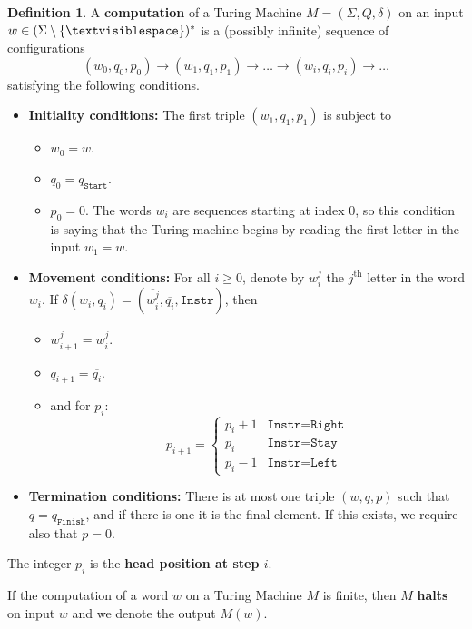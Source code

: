\documentclass[12pt]{article}
\theoremstyle{plain}
\theoremstyle{definition}
\newtheorem{defn}[thm]{Definition} %
\newcommand{\lto}{\longrightarrow}
\newcommand{\blank}{\textvisiblespace}
\begin{document}
	\begin{defn}\label{def:computation}
		A \textbf{computation} of a Turing Machine $M = (\Sigma, Q, \delta)$ on an input $w \in (\Sigma\setminus \{ \blank\})^\ast$ is a (possibly infinite) sequence of configurations
		\begin{equation}
			(w_0, q_0, p_0) \lto (w_1, q_1, p_1) \lto \ldots \lto (w_i, q_i, p_i) \lto \ldots
			\end{equation}
		satisfying the following conditions.
		\begin{itemize}
			\item \textbf{Initiality conditions:} The first triple $(w_1, q_1, p_1)$ is subject to
			\begin{itemize}
				\item $w_0 = w$.
				\item $q_0 = q_{\texttt{Start}}$.
				\item $p_0 = 0$. The words $w_i$ are sequences starting at index $0$, so this condition is saying that the Turing machine begins by reading the first letter in the input $w_1 = w$.
				\end{itemize}
			\item \textbf{Movement conditions:} For all $i \geq 0$, denote by $w_i^j$ the $j^{\text{th}}$ letter in the word $w_i$. If $\delta(w_i, q_i) = (\overline{w_i^j}, \overline{q_i}, \texttt{Instr})$, then
			\begin{itemize}
				\item $w_{i+1}^j = \overline{w_i^j}$.
				\item $q_{i+1} = \overline{q_i}$.
				\item and for $p_i$:
				\begin{equation}
					p_{i+1} =
					\begin{cases}
						p_i + 1& \texttt{Instr} = \texttt{Right}\\
						p_i & \texttt{Instr} = \texttt{Stay}\\
						p_i - 1 & \texttt{Instr} = \texttt{Left}
						\end{cases}
					\end{equation}
				\end{itemize}
			\item \textbf{Termination conditions: } There is at most one triple $(w,q,p)$ such that $q = q_{\texttt{Finish}}$, and if there is one it is the final element. If this exists, we require also that $p = 0$.
			\end{itemize}
		The integer $p_i$ is the \textbf{head position at step $i$}.
		
		If the computation of a word $w$ on a Turing Machine $M$ is finite, then $M$ \textbf{halts} on input $w$ and we denote the output $M(w)$.
		\end{defn}
	
\end{document}
